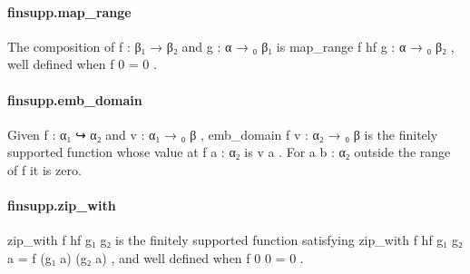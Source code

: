 \documentclass{article}
\begin{document}
\paragraph{finsupp.map\_range}
\par
The composition of 
\colorbox[RGB]{253,246,227}{{{{\color[RGB]{101, 123, 131} f : β₁  }}}{{{\color[RGB]{133, 153, 0} → }}}{{{\color[RGB]{101, 123, 131}  β₂ }}}} and 
\colorbox[RGB]{253,246,227}{{{{\color[RGB]{101, 123, 131} g : α  }}}{{{\color[RGB]{133, 153, 0} → }}}{{{\color[RGB]{101, 123, 131} ₀ β₁ }}}} is
\colorbox[RGB]{253,246,227}{{{{\color[RGB]{101, 123, 131} map\_range f hf g : α  }}}{{{\color[RGB]{133, 153, 0} → }}}{{{\color[RGB]{101, 123, 131} ₀ β₂ }}}}, well defined when 
\colorbox[RGB]{253,246,227}{{{{\color[RGB]{101, 123, 131} f  }}}{{{\color[RGB]{108, 113, 196} 0 }}}{{{\color[RGB]{101, 123, 131}   }}}{{{\color[RGB]{181, 137, 0} = }}}{{{\color[RGB]{101, 123, 131}   }}}{{{\color[RGB]{108, 113, 196} 0 }}}}.
\paragraph{finsupp.emb\_domain}
\par
Given 
\colorbox[RGB]{253,246,227}{{{{\color[RGB]{101, 123, 131} f : α₁ ↪ α₂ }}}} and 
\colorbox[RGB]{253,246,227}{{{{\color[RGB]{101, 123, 131} v : α₁  }}}{{{\color[RGB]{133, 153, 0} → }}}{{{\color[RGB]{101, 123, 131} ₀ β }}}}, 
\colorbox[RGB]{253,246,227}{{{{\color[RGB]{101, 123, 131} emb\_domain f v : α₂  }}}{{{\color[RGB]{133, 153, 0} → }}}{{{\color[RGB]{101, 123, 131} ₀ β }}}} is the finitely supported
function whose value at 
\colorbox[RGB]{253,246,227}{{{{\color[RGB]{101, 123, 131} f a : α₂ }}}} is 
\colorbox[RGB]{253,246,227}{{{{\color[RGB]{101, 123, 131} v a }}}}. For a 
\colorbox[RGB]{253,246,227}{{{{\color[RGB]{101, 123, 131} b : α₂ }}}} outside the range of 
\colorbox[RGB]{253,246,227}{{{{\color[RGB]{101, 123, 131} f }}}} it is zero.
\paragraph{finsupp.zip\_with}
\par
\colorbox[RGB]{253,246,227}{{{{\color[RGB]{101, 123, 131} zip\_with f hf g₁ g₂ }}}} is the finitely supported function satisfying
\colorbox[RGB]{253,246,227}{{{{\color[RGB]{101, 123, 131} zip\_with f hf g₁ g₂ a  }}}{{{\color[RGB]{181, 137, 0} = }}}{{{\color[RGB]{101, 123, 131}  f (g₁ a) (g₂ a) }}}}, and well defined when 
\colorbox[RGB]{253,246,227}{{{{\color[RGB]{101, 123, 131} f  }}}{{{\color[RGB]{108, 113, 196} 0 }}}{{{\color[RGB]{101, 123, 131}   }}}{{{\color[RGB]{108, 113, 196} 0 }}}{{{\color[RGB]{101, 123, 131}   }}}{{{\color[RGB]{181, 137, 0} = }}}{{{\color[RGB]{101, 123, 131}   }}}{{{\color[RGB]{108, 113, 196} 0 }}}}.
\end{document}
